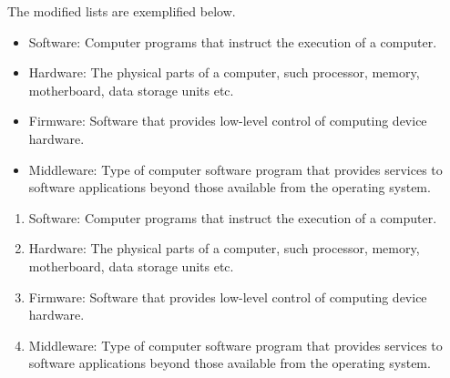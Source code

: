 \documentclass[a4paper, 11pt]{article}
\begin{document}
The modified lists are exemplified below.

\begin{example}{}
    \begin{itemize}
        \item Software: Computer programs that instruct the execution of a computer.
        \item Hardware: The physical parts of a computer, such processor, memory, motherboard, data storage units etc.
        \item Firmware: Software that provides low-level control of computing device hardware.
        \item Middleware: Type of computer software program that provides services to software applications beyond those available from the operating system.
    \end{itemize}
\end{example}

\begin{example}{}
    \begin{enumerate}
        \item Software: Computer programs that instruct the execution of a computer.
        \item Hardware: The physical parts of a computer, such processor, memory, motherboard, data storage units etc.
        \item Firmware: Software that provides low-level control of computing device hardware.
        \item Middleware: Type of computer software program that provides services to software applications beyond those available from the operating system.
    \end{enumerate}
\end{example}
\end{document}
